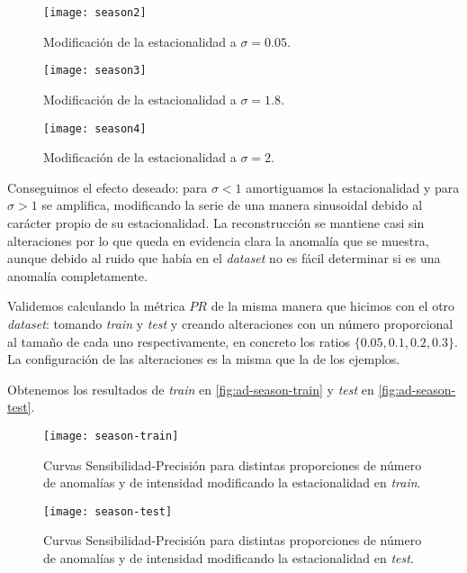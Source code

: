 \begin{figure}[htpb]
  \centering
  \texttt{[image: season2]}
  \caption{Modificación de la estacionalidad a $\sigma = 0.05$.}
  \label{fig:ad-season2}
\end{figure}

\begin{figure}[htpb]
  \centering
  \texttt{[image: season3]}
  \caption{Modificación de la estacionalidad a $\sigma = 1.8$.}
  \label{fig:ad-season3}
\end{figure}

\begin{figure}[htpb]
  \centering
  \texttt{[image: season4]}
  \caption{Modificación de la estacionalidad a $\sigma = 2$.}
  \label{fig:ad-season4}
\end{figure}

Conseguimos el efecto deseado: para $\sigma < 1$ amortiguamos la estacionalidad y para $\sigma > 1$ se amplifica, modificando la serie de una manera sinusoidal debido al carácter propio de su estacionalidad. La reconstrucción se mantiene casi sin alteraciones por lo que queda en evidencia clara la anomalía que se muestra, aunque debido al ruido que había en el \emph{dataset} no es fácil determinar si es una anomalía completamente.

Validemos calculando la métrica $PR$ de la misma manera que hicimos con el otro \emph{dataset}: tomando \emph{train} y \emph{test} y creando alteraciones con un número proporcional al tamaño de cada uno respectivamente, en concreto los ratios $\{0.05, 0.1, 0.2, 0.3\}$. La configuración de las alteraciones es la misma que la de los ejemplos.

Obtenemos los resultados de \emph{train} en \autoref{fig:ad-season-train} y \emph{test} en \autoref{fig:ad-season-test}.

\begin{figure}[htpb]
  \centering
  \texttt{[image: season-train]}
  \caption{Curvas Sensibilidad-Precisión para distintas proporciones de número de anomalías y de intensidad modificando la estacionalidad en \emph{train}.}
  \label{fig:ad-season-train}
\end{figure}

\begin{figure}[htpb]
  \centering
  \texttt{[image: season-test]}
  \caption{Curvas Sensibilidad-Precisión para distintas proporciones de número de anomalías y de intensidad modificando la estacionalidad en \emph{test}.}
  \label{fig:ad-season-test}
\end{figure}

